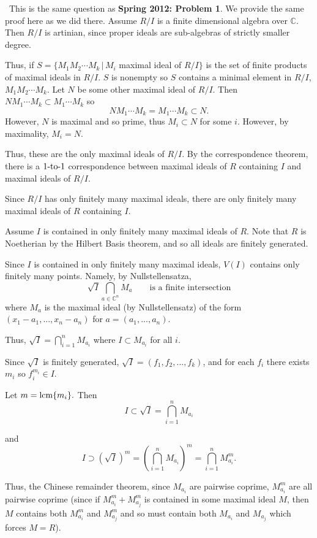 \documentclass[12pt]{Qual}
\begin{document}
\begin{solution}$\,$
This is the same question as \textbf{Spring 2012: Problem 1}. We provide the same proof here as we did there.
\boxed{\implies} Assume $R/I$ is a finite dimensional algebra over $\mathbb{C}$. Then $R/I$ is artinian, since proper ideals are sub-algebras of strictly smaller degree.

Thus, if $S=\{M_1M_2\cdots M_k\,|\, M_i$ maximal ideal of $R/I\}$ is the set of finite products of maximal ideals in $R/I$. $S$ is nonempty so $S$ contains a minimal element in $R/I$, $M_1M_2\cdots M_k$. Let $N$ be some other maximal ideal of $R/I$. Then $NM_1\cdots M_k\subset M_1\cdots M_k$ so $$NM_1\cdots M_k= M_1\cdots M_k\subset N.$$ However, $N$ is maximal and so prime, thus $M_i\subset N$ for some $i$. However, by maximality, $M_i=N$.

Thus, these are the only maximal ideals of $R/I$. By the correspondence theorem, there is a $1\text{-to-}1$ correspondence between maximal ideals of $R$ containing $I$ and maximal ideals of $R/I$.

Since $R/I$ has only finitely many maximal ideals, there are only finitely many maximal ideals of $R$ containing $I.$

\boxed{\impliedby} Assume $I$ is contained in only finitely many maximal ideals of $R$. Note that $R$ is Noetherian by the Hilbert Basis theorem, and so all ideals are finitely generated.

Since $I$ is contained in only finitely many maximal ideals, $V(I)$ contains only finitely many points. Namely, by Nullstellensatza, $$\sqrt{I}\bigcap_{a\in\mathbb{C}^n}M_a\qquad \text{is a finite intersection}$$ where $M_a$ is the maximal ideal (by Nullstellensatz) of the form $(x_1-a_1,...,x_n-a_n)$ for $a=(a_1,...,a_n)$.

Thus, $\sqrt{I}=\bigcap_{i=1}^nM_{a_i}$ where $I\subset M_{a_i}$ for all $i$.

Since $\sqrt{I}$ is finitely generated, $\sqrt{I}=(f_1,f_2,...,f_k)$, and for each $f_i$ there exists $m_i$ so $f_i^{m_i}\in I$.

Let $m=\text{lcm}\{m_i\}.$ Then $$I\subset\sqrt{I}=\bigcap_{i=1}^nM_{a_i}$$

and $$I\supset (\sqrt{I})^m=\left(\bigcap_{i=1}^nM_{a_i}\right)^m=\bigcap_{i=1}^nM_{a_i}^m.$$

Thus, the Chinese remainder theorem, since $M_{a_i}$ are pairwise coprime, $M_{a_i}^m$ are all pairwise coprime (since if $M_{a_i}^m+M_{a_j}^m$ is contained in some maximal ideal $M$, then $M$ contains both $M_{a_i}^m$ and $M_{a_j}^m$ and so must contain both $M_{a_i}$ and $M_{a_j}$ which forces $M=R$).


\end{solution}
\end{document}
